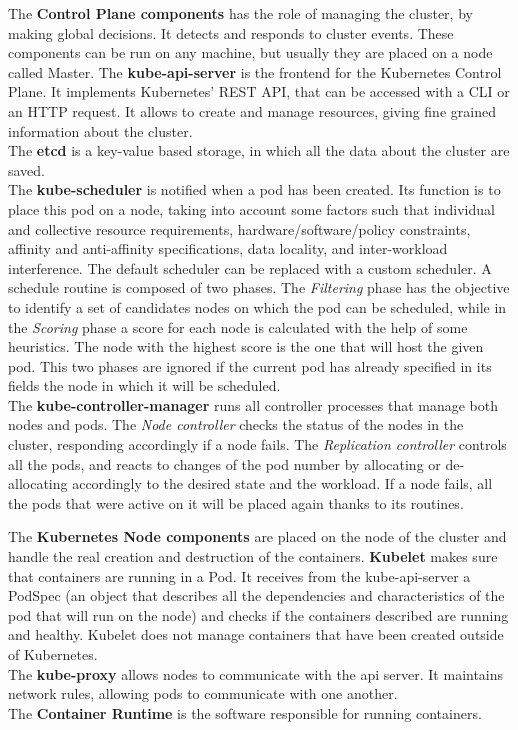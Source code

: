 The \textbf{Control Plane components} has the role of managing the cluster, by making global decisions.
It detects and responds to cluster events. These components can be run on any machine, but usually
they are placed on a node called Master.
The \textbf{kube-api-server} is the frontend for the Kubernetes Control Plane. It implements Kubernetes'
REST API, that can be accessed with a CLI or an HTTP request. It allows to create and manage resources,
giving fine grained information about the cluster.
\\
The \textbf{etcd} is a key-value based storage, in which all the data about the cluster are saved.
\\
The \textbf{kube-scheduler} is notified when a pod has been created. Its function is to place this pod
on a node, taking into account some factors such that individual and collective resource
requirements, hardware/software/policy constraints, affinity and anti-affinity specifications,
data locality, and inter-workload interference.
The default scheduler can be replaced with a custom scheduler. A schedule routine
is composed of two phases. The \textit{Filtering} phase has the objective to identify a set 
of candidates nodes on which the pod can be scheduled, while in the \textit{Scoring} phase
a score for each node is calculated with the help of some heuristics. The node with the highest score
is the one that will host the given pod.
This two phases are ignored if the current pod has already specified in its fields the node
in which it will be scheduled.
\\
The \textbf{kube-controller-manager} runs all controller processes that manage both nodes and 
pods. The \textit{Node controller}
checks the status of the nodes in the cluster, responding accordingly if a node fails.
The \textit{Replication controller} controls all the pods, and reacts to changes of the pod number
by allocating or de-allocating accordingly to the desired state and the workload. If a node fails, all 
the pods that were active on it will be placed again thanks to its routines.
\par 
The \textbf{Kubernetes Node components} are placed on the node of the cluster and handle
the real creation and destruction of the containers.
\textbf{Kubelet} makes sure that containers are running in a Pod. It receives from the kube-api-server
a PodSpec (an object that describes all the dependencies and characteristics of the pod that
will run on the node) and checks if the containers described are running and healthy.
Kubelet does not manage containers that have been created outside of Kubernetes.
\\
The \textbf{kube-proxy} allows nodes to communicate with the api server. It maintains network rules,
allowing pods to communicate with one another.
\\
The \textbf{Container Runtime} is the software responsible for running containers.
